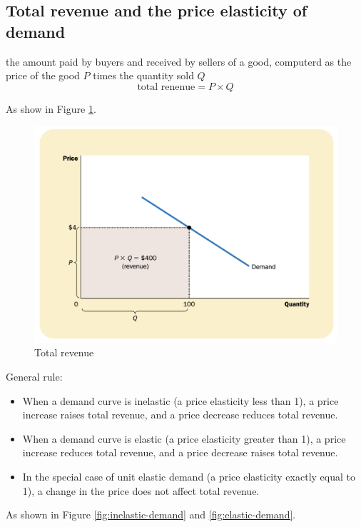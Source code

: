 \subsection{Total revenue and the price elasticity of demand}

\begin{tcolorbox}
  the amount paid by buyers and received by sellers of a good,
  computerd as the price of the good $P$ times the quantity sold $Q$
  \begin{equation}
    \text{total renenue} = P\times Q
  \end{equation}

  As show in Figure \ref{fig:total-revenue}.
\end{tcolorbox}

\begin{figure}[!ht]
  \centering
  \includegraphics[width=\textwidth]{pics/total-revenue}
  \caption{Total revenue}
  \label{fig:total-revenue}
\end{figure}

\begin{tcolorbox}
  General rule:
  \begin{itemize}
  \item When a demand curve is inelastic (a price elasticity less than 1), a price increase raises total revenue, and a price decrease reduces total revenue.
  \item When a demand curve is elastic (a price elasticity greater than 1), a price increase reduces total revenue, and a price decrease raises total revenue.
  \item In the special case of unit elastic demand (a price elasticity exactly equal to 1), a change in the price does not affect total revenue.
  \end{itemize}

  As shown in Figure \ref{fig:inelastic-demand} and \ref{fig:elastic-demand}.
\end{tcolorbox}


